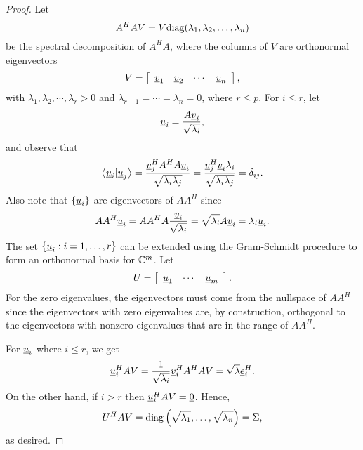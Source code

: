 \begin{proof}
Let
\begin{equation*}
A^H A V = V \mathrm{diag} ( \lambda_1, \lambda_2, \ldots, \lambda_n )
\end{equation*}
be the spectral decomposition of $A^H A$, where the columns of $V$ are orthonormal eigenvectors
\begin{equation*}
V = \left[ \begin{array}{cccc} \underline{v}_1 & \underline{v}_2 & \cdots & \underline{v}_n \end{array} \right], 
\end{equation*}
with $\lambda_1, \lambda_2, \cdots, \lambda_r > 0$ and $\lambda_{r+1} = \cdots = \lambda_{n} = 0$, where $r \leq p$.
For $i \leq r$, let
\begin{equation*}
\underline{u}_i = \frac{A \underline{v}_i}{\sqrt{\lambda_i}},
\end{equation*}
and observe that
\begin{equation*}
\left\langle \underline{u}_i | \underline{u}_j \right\rangle
= \frac{\underline{v}_j^H A^H A \underline{v}_i}{\sqrt{\lambda_i \lambda_j}}
= \frac{\underline{v}_j^H \underline{v}_i \lambda_i}{\sqrt{\lambda_i \lambda_j}}
= \delta_{ij} .
\end{equation*}
Also note that $\{ \underline{u}_i \}$ are eigenvectors of $A A^H$ since
\begin{equation*}
A A^H \underline{u}_i
= A A^H A \frac{\underline{v}_i}{\sqrt{\lambda_i}}
= \sqrt{\lambda_i} A \underline{v}_i
= \lambda_i \underline{u}_i .
\end{equation*}
The set $\left\{ \underline{u}_i: i = 1, \ldots, r \right\}$ can be extended using the Gram-Schmidt procedure to form an orthonormal basis for $\mathbb{C}^m$.
Let
\begin{equation*}
U = \left[ \begin{array}{ccc} \underline{u}_1 & \cdots & \underline{u}_m \end{array} \right] .
\end{equation*}
For the zero eigenvalues, the eigenvectors must come from the nullspace of $A A^H$ since the eigenvectors with zero eigenvalues are, by construction, orthogonal to the eigenvectors with nonzero eigenvalues that are in the range of $A A^H$.

For $\underline{u}_i$ where $i \leq r$, we get
\begin{equation*}
\underline{u}_i^H A V 
= \frac{1}{\sqrt{\lambda_i}} \underline{v}_i^H A^H A V
= \sqrt{\lambda} \underline{e}_i^H .
\end{equation*}
On the other hand, if $i > r$ then $\underline{u}_i^H A V = \underline{0}$.
Hence,
\begin{equation*}
U^H A V = \mathrm{diag} \left( \sqrt{\lambda_1}, \ldots, \sqrt{\lambda_n} \right)
= \Sigma ,
\end{equation*}
as desired.
\end{proof}

